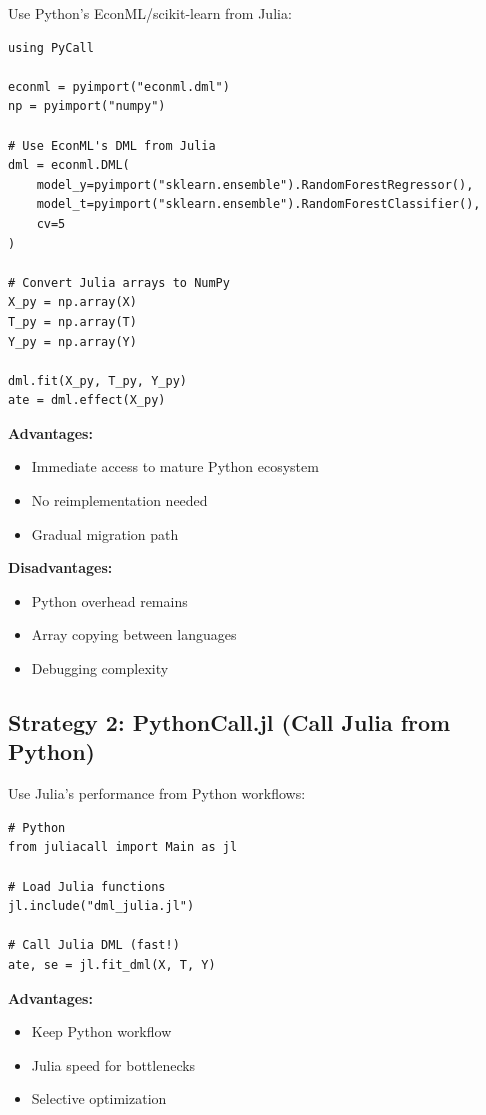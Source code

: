 Use Python's EconML/scikit-learn from Julia:

\begin{verbatim}
using PyCall

econml = pyimport("econml.dml")
np = pyimport("numpy")

# Use EconML's DML from Julia
dml = econml.DML(
    model_y=pyimport("sklearn.ensemble").RandomForestRegressor(),
    model_t=pyimport("sklearn.ensemble").RandomForestClassifier(),
    cv=5
)

# Convert Julia arrays to NumPy
X_py = np.array(X)
T_py = np.array(T)
Y_py = np.array(Y)

dml.fit(X_py, T_py, Y_py)
ate = dml.effect(X_py)
\end{verbatim}

\textbf{Advantages:}
\begin{itemize}
    \item Immediate access to mature Python ecosystem
    \item No reimplementation needed
    \item Gradual migration path
\end{itemize}

\textbf{Disadvantages:}
\begin{itemize}
    \item Python overhead remains
    \item Array copying between languages
    \item Debugging complexity
\end{itemize}

\subsection{Strategy 2: PythonCall.jl (Call Julia from Python)}

Use Julia's performance from Python workflows:

\begin{verbatim}
# Python
from juliacall import Main as jl

# Load Julia functions
jl.include("dml_julia.jl")

# Call Julia DML (fast!)
ate, se = jl.fit_dml(X, T, Y)
\end{verbatim}

\textbf{Advantages:}
\begin{itemize}
    \item Keep Python workflow
    \item Julia speed for bottlenecks
    \item Selective optimization
\end{itemize}

